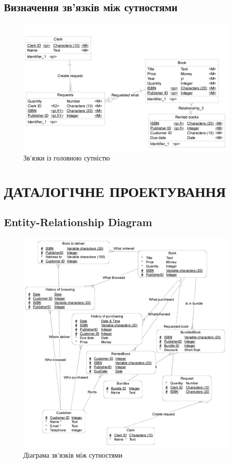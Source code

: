 \documentclass[a4paper,notitlepage,headsepline,pdftex,oneside]{report}
\newcommand{\setfontsize}[1]{\fontsize{#1pt}{#1pt}\selectfont}
\newcommand{\Chapter}[1]{\chapter{#1} \renewcommand{\baselinestretch}{1.5}\setfontsize{14pt}}
\newcommand{\Section}[1]{\section{#1} \renewcommand{\baselinestretch}{1.5}\setfontsize{14pt}}
\begin{document}
  \Section{Визначення зв’язків між сутностями}
    \begin{figure}[h]
      \centering
      \includegraphics{small_erd.png}
      \caption{Зв’язки із головною сутністю}
      \label{fig:small-erd}
    \end{figure}
  \clearpage
\Chapter{ДАТАЛОГІЧНЕ ПРОЕКТУВАННЯ}
  \Section{Entity-Relationship Diagram}
    \begin{figure}[h]
      \centering
      \includegraphics{big_erd.png}
      \caption{Діаграма зв’язків між сутностями}
      \label{fig:erd}
    \end{figure}
\end{document}
